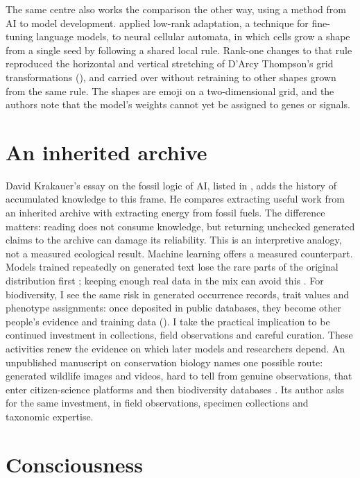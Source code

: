 The same centre also works the comparison the other way, using a method from
AI to model development. \textcite{hartl2026growthform} applied low-rank adaptation, a
technique for fine-tuning language models, to neural cellular automata, in
which cells grow a shape from a single seed by following a shared local rule.
Rank-one changes to that rule reproduced the horizontal and vertical stretching
of D'Arcy Thompson's grid transformations (), and carried
over without retraining to other shapes grown from the same rule. The shapes
are emoji on a two-dimensional grid, and the authors note that the model's
weights cannot yet be assigned to genes or signals.

\section{An inherited archive}

David Krakauer's essay on the fossil logic of AI, listed in ,
adds the history of accumulated knowledge to this frame. He compares extracting
useful work from an inherited archive with extracting energy from fossil fuels.
The difference matters: reading does not consume knowledge, but returning
unchecked generated claims to the archive can damage its reliability. This is
an interpretive analogy, not a measured ecological result. Machine learning
offers a measured counterpart. Models trained repeatedly on generated text lose
the rare parts of the original distribution first \parencite{shumailov2024collapse};
keeping enough real data in the mix can avoid this \parencite{seddik2024collapse}.
For biodiversity, I see the same risk in generated occurrence records, trait
values and phenotype assignments: once deposited in public databases, they
become other people's evidence and training data ().
I take the practical implication to be continued investment in collections,
field observations and careful curation. These activities renew the evidence
on which later models and researchers depend. An unpublished manuscript on
conservation biology names one possible route: generated wildlife images and
videos, hard to tell from genuine observations, that enter citizen-science
platforms and then biodiversity databases \parencite{sun2026naturalists}. Its
author asks for the same investment, in field observations, specimen
collections and taxonomic expertise.

\section{Consciousness}

